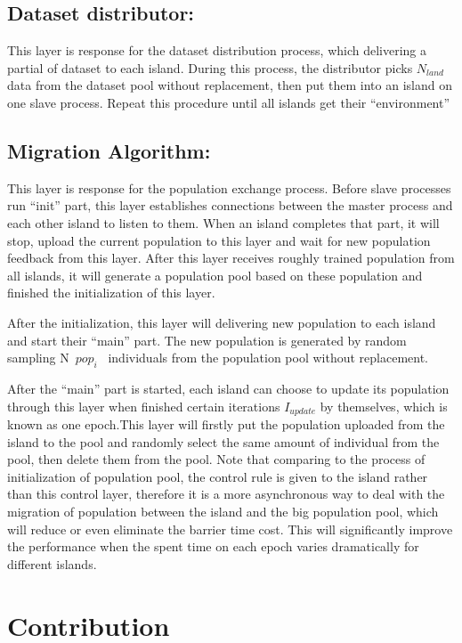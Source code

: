\documentclass[conference]{IEEEtran}
\begin{document}
	\subsection{Dataset distributor:}
	This layer is response for the dataset distribution process, which delivering a partial of dataset to each island. During this process, the distributor picks $N_{land}$ data from the dataset pool without replacement, then put them into an island on one slave process. Repeat this procedure until all islands get their “environment”
	\subsection{Migration Algorithm:}
	This layer is response for the population exchange process. Before slave processes run “init” part, this layer establishes connections between the master process and each other island to listen to them. When an island completes that part, it will stop, upload the current population to this layer and wait for new population feedback from this layer. After this layer receives roughly trained population from all islands, it will generate a population pool based on these population and finished the initialization of this layer.
	
	
	After the initialization, this layer will delivering new population to each island and start their “main” part. The new population is generated by random sampling N~$pop_i$~ individuals from the population pool without replacement.
	
	
	After the “main” part is started, each island can choose to update its population through this layer when finished certain iterations $I_{update}$ by themselves, which is known as one epoch.This layer will firstly put the population uploaded from the island to the pool and randomly select the same amount of individual from the pool, then delete them from the pool. Note that comparing to the process of initialization of population pool, the control rule is given to the island rather than this control layer, therefore it is a more asynchronous way to deal with the migration of population between the island and the big population pool, which will reduce or even eliminate the barrier time cost. This will significantly improve the performance when the spent time on each epoch varies dramatically for different islands.
	
  \section{Contribution}
  
\end{document}
